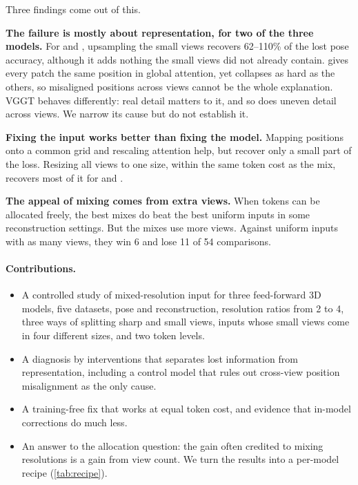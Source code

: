 Three findings come out of this.

\noindent\textbf{The failure is mostly about representation, for two of the three models.} For \pithree and \dathree, upsampling the small views recovers 62--110\% of the lost pose accuracy, although it adds nothing the small views did not already contain. \dathree gives every patch the same position in global attention, yet collapses as hard as the others, so misaligned positions across views cannot be the whole explanation. VGGT behaves differently: real detail matters to it, and so does uneven detail across views. We narrow its cause but do not establish it.

\noindent\textbf{Fixing the input works better than fixing the model.} Mapping positions onto a common grid and rescaling attention help, but recover only a small part of the loss. Resizing all views to one size, within the same token cost as the mix, recovers most of it for \pithree and \dathree.

\noindent\textbf{The appeal of mixing comes from extra views.} When tokens can be allocated freely, the best mixes do beat the best uniform inputs in some reconstruction settings. But the mixes use more views. Against uniform inputs with as many views, they win 6 and lose 11 of 54 comparisons.

\paragraph{Contributions.}
\begin{itemize}[nosep,leftmargin=*]
  \item A controlled study of mixed-resolution input for three feed-forward 3D models, five datasets, pose and reconstruction, resolution ratios from 2 to 4, three ways of splitting sharp and small views, inputs whose small views come in four different sizes, and two token levels.
  \item A diagnosis by interventions that separates lost information from representation, including a control model that rules out cross-view position misalignment as the only cause.
  \item A training-free fix that works at equal token cost, and evidence that in-model corrections do much less.
  \item An answer to the allocation question: the gain often credited to mixing resolutions is a gain from view count. We turn the results into a per-model recipe (\cref{tab:recipe}).
\end{itemize}
